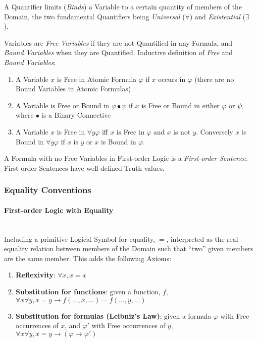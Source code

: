 \documentclass{article}
\begin{document}
A Quantifier limits (\emph{Binds}) a Variable to a certain quantity of
members of the Domain, the two fundamental Quantifiers being
\emph{Universal} ($\forall$) and \emph{Existential} ($\exists$).

Variables are \emph{Free Variables} if they are not Quantified in any
Formula, and \emph{Bound Variables} when they are Quantified.
Inductive definition of \emph{Free} and \emph{Bound Variables}:
\begin{enumerate}
\item A Variable $x$ is Free in Atomic Formula $\varphi$ if $x$ occurs
  in $\varphi$ (there are no Bound Variables in Atomic Formulas)
\item A Variable is Free or Bound in $\varphi \bullet \psi$ if $x$ is
  Free or Bound in either $\varphi$ or $\psi$, where $\bullet$ is a
  Binary Connective
\item A Variable $x$ is Free in $\forall y \varphi$ iff $x$ is Free in
  $\varphi$ and $x$ is not $y$. Conversely $x$ is Bound in $\forall y
  \varphi$ if $x$ is $y$ or $x$ is Bound in $\varphi$.
\end{enumerate}

A Formula with no Free Variables in First-order Logic is a
\emph{First-order Sentence}. First-order Sentences have well-defined
Truth values.

\subsubsection{Equality Conventions}

\paragraph{First-order Logic with Equality}\hfill
\\ Including a primitive Logical Symbol for equality, $=$, interpreted
as the real equality relation between members of the Domain such that
``two'' given members are the same member. This adds the following
Axioms:

\begin{enumerate}
\item \textbf{Reflexivity}: $\forall x, x=x$
\item \textbf{Substitution for functions}: given a function, $f$,
  $\forall x \forall y, x = y \rightarrow f(\ldots,x,\ldots) =
  f(\ldots,y,\ldots)$
\item \textbf{Substitution for formulas (Leibniz's Law)}: given a
  formula $\varphi$ with Free occurrences of $x$, and $\varphi '$ with
  Free occurrences of $y$, $\forall x \forall y, x = y \rightarrow
  (\varphi \rightarrow \varphi ')$
\end{enumerate}
\end{document}
